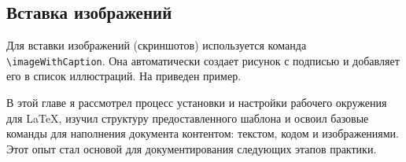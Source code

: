 \subsection{Вставка изображений}\label{subsec:inserting-images}
Для вставки изображений (скриншотов) используется команда \texttt{\textbackslash imageWithCaption}.
Она автоматически создает рисунок с подписью и добавляет его в список иллюстраций.
На  приведен пример.

\label{fig:git_branching_example}


В этой главе я рассмотрел процесс установки и настройки рабочего окружения для \LaTeX{}, изучил структуру предоставленного шаблона и освоил базовые команды для наполнения документа контентом: текстом, кодом и изображениями.
Этот опыт стал основой для документирования следующих этапов практики.
